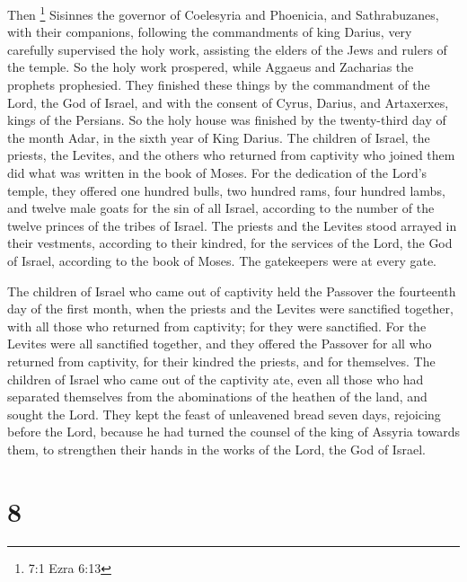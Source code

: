  Then \footnote{7:1 Ezra 6:13} Sisinnes the governor of
Coelesyria and Phoenicia, and Sathrabuzanes, with their companions,
following the commandments of king Darius,  very carefully
supervised the holy work, assisting the elders of the Jews and rulers of
the temple.  So the holy work prospered, while Aggaeus and
Zacharias the prophets prophesied.  They finished these
things by the commandment of the Lord, the God of Israel, and with the
consent of Cyrus, Darius, and Artaxerxes, kings of the Persians.
 So the holy house was finished by the twenty-third day of
the month Adar, in the sixth year of King Darius.  The
children of Israel, the priests, the Levites, and the others who
returned from captivity who joined them did what was written in the book
of Moses.  For the dedication of the Lord's temple, they
offered one hundred bulls, two hundred rams, four hundred lambs,
 and twelve male goats for the sin of all Israel, according
to the number of the twelve princes of the tribes of Israel.
 The priests and the Levites stood arrayed in their
vestments, according to their kindred, for the services of the Lord, the
God of Israel, according to the book of Moses. The gatekeepers were at
every gate.

 The children of Israel who came out of captivity held the
Passover the fourteenth day of the first month, when the priests and the
Levites were sanctified together,  with all those who
returned from captivity; for they were sanctified. For the Levites were
all sanctified together,  and they offered the Passover for
all who returned from captivity, for their kindred the priests, and for
themselves.  The children of Israel who came out of the
captivity ate, even all those who had separated themselves from the
abominations of the heathen of the land, and sought the Lord.
 They kept the feast of unleavened bread seven days,
rejoicing before the Lord,  because he had turned the
counsel of the king of Assyria towards them, to strengthen their hands
in the works of the Lord, the God of Israel.

\hypertarget{section-7}{%
\section{8}\label{section-7}}

